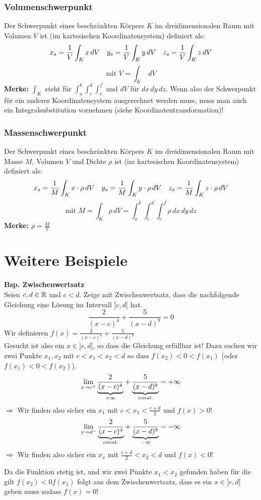 \subsubsection{Volumenschwerpunkt}
Der Schwerpunkt eines beschränkten Körpers $K$ im dreidimensionalen Raum mit Volumen $V$ ist (im kartesischen Koordinatensystem) definiert als:
\[
	x_s = \frac{1}{V} \int_K x \, dV \hspace{10pt} y_s = \frac{1}{V} \int_K y \, dV \hspace{10pt} z_s = \frac{1}{V} \int_K z \, dV
\]
\[
	\text{mit } V = \int_K \; dV
\]
\textbf{Merke:} 
$\int_K$ steht für $\int_a^b \int_c^d \int_e^f$ und $dV$ für $dx \,dy \, dz$. Wenn also der Schwerpunkt für ein anderes Koordinatensystem ausgerechnet werden muss, muss man auch ein Integralsubstitution vornehmen (siehe Koordinatentransformation)!

\subsubsection{Massenschwerpunkt}
Der Schwerpunkt eines beschränkten Körpers $K$ im dreidimensionalen Raum mit Masse $M$, Volumen $V$ und Dichte $\rho$ ist (im kartesischen Koordinatensystem) definiert als:
\[
	x_s = \frac{1}{M} \int_K x \cdot \rho \, dV \hspace{10pt} 
	y_s = \frac{1}{M} \int_K y \cdot \rho \, dV \hspace{10pt} 
	z_s = \frac{1}{M} \int_K z \cdot \rho \, dV
\]
\[
	\text{mit } M = \int_K \rho \, dV = \int_a^b \int_c^d \int_e^f \rho \, dx \, dy \, dz
\]
\textbf{Merke:} $\rho = \frac{M}{V}$\\

\section{Weitere Beispiele}
\textbf{Bsp. Zwischenwertsatz}\\
Seien $c, d \in \mathbb{R}$ und $c < d$. Zeige mit Zwischenwertsatz, dass die nachfolgende Gleichung eine Lösung im Intervall $]c, d[$ hat.
\[
	\frac{2}{(x - c)^4} + \frac{5}{(x - d)^9} = 0
\]
Wir definieren $f(x) = \frac{2}{(x - c)^4} + \frac{5}{(x - d)^9}$\\
Gesucht ist also ein $x \in ]c, d[$, so dass die Gleichung erfüllbar ist! 
Dazu suchen wir zwei Punkte $x_1, x_2$ mit $c < x_1 < x_2 < d$ so dass $f(x_2) < 0 < f(x_1)$   (oder $f(x_1) < 0 < f(x_2)$).
\[
	\lim_{x \to c^{+}} \underset{+ \infty}{\underbrace{\frac{2}{(x - c)^4}}} + \underset{const.}{\underbrace{\frac{5}{(x - d)^9}}} = + \infty
\]
$\Rightarrow$ Wir finden also sicher ein $x_1$ mit $c < x_1 < \frac{c + d}{2}$ und $f(x) > 0$!
\[
	\lim_{x \to d^{-}} \underset{const.}{\underbrace{\frac{2}{(x - c)^4}}} + \underset{- \infty}{\underbrace{\frac{5}{(x - d)^9}}} = - \infty
\]
$\Rightarrow$ Wir finden also sicher ein $x_x$ mit $\frac{c + d}{2} < x_2 < d$ und $f(x) < 0$!

Da die Funktion stetig ist, und wir zwei Punkte $x_1 < x_2$ gefunden haben für die gilt $f(x_2) < 0 f(x_1)$ folgt aus dem Zwischenwertsatz, dass es ein $x \in ]c, d[$ geben muss sodass $f(x) = 0$!